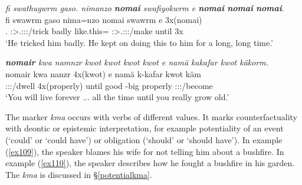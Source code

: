 \begin{exe}
	\ex \emph{fi swathugwrm gaso. nimanzo \textbf{nomai} swafiyokwrm e \textbf{nomai} \textbf{nomai} \textbf{nomai}.}\\
	\gll fi swawrm gaso nima=nzo nomai swawrm e 3x(nomai)\\
	\Tsg.\Abs{} \Stsg:\Sbj>\Tsg.\Masc:\Obj:\Pst:\Dur/trick badly {like.this}=\Only{} \Hab{} \Stsg:\Sbj>\Tsg.\Masc:\Obj:\Pst:\Dur/make until 3x\Hab{}\\
	\trans `He tricked him badly. He kept on doing this to him for a long, long time.'\\
	\label{ex107}
\end{exe}
\begin{exe}
	\ex \emph{\textbf{nomair} kwa namnzr kwot kwot kwot kwot e namä kakafar kwot käkorm.}\\
	\gll nomair kwa nanzr 4x(kwot) e namä k-kafar kwot käm\\
	\Hab{} \Fut{} \Ssg:\Sbj:\Nonpast:\Ipfv/dwell 4x(properly) until good \Redup{}-big properly \Ssg:\Sbj:\Imp:\Pfv/become\\
	\trans `You will live forever ... all the time until you really grow old.'\\
	\label{ex108}
\end{exe}

The  marker \emph{kma} occurs with verbs of different  values. It marks counterfactuality with deontic or epistemic interpretation, for example potentiality of an event (`could' or `could have') or obligation (`should' or `should have'). In example (\ref{ex109}), the speaker blames his wife for not telling him about a bushfire. In example (\ref{ex110}), the speaker describes how he fought a bushfire in his garden. The  \emph{kma} is discussed in \S{}\ref{potentialkma}.

